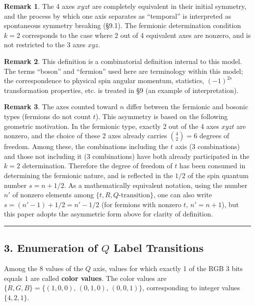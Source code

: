 \documentclass[
  a4paper,11pt]{article}
\theoremstyle{definition}
\theoremstyle{remark}
\begin{document}
\textbf{Remark 1}. The 4 axes \(xyzt\) are completely equivalent in
their initial symmetry, and the process by which one axis separates as
``temporal'' is interpreted as spontaneous symmetry breaking (§9.1). The
fermionic determination condition \(k = 2\) corresponds to the case
where 2 out of 4 equivalent axes are nonzero, and is not restricted to
the 3 axes \(xyz\).

\textbf{Remark 2}. This definition is a combinatorial definition
internal to this model. The terms ``boson'' and ``fermion'' used here
are terminology within this model; the correspondence to physical spin
angular momentum, statistics, \((-1)^{2s}\) transformation properties,
etc. is treated in §9 (an example of interpretation).

\textbf{Remark 3}. The axes counted toward \(n\) differ between the
fermionic and bosonic types (fermions do not count \(t\)). This
asymmetry is based on the following geometric motivation. In the
fermionic type, exactly 2 out of the 4 axes \(xyzt\) are nonzero, and
the choice of these 2 axes already carries \(\binom{4}{2} = 6\) degrees
of freedom. Among these, the combinations including the \(t\) axis (3
combinations) and those not including it (3 combinations) have both
already participated in the \(k = 2\) determination. Therefore the
degree of freedom of \(t\) has been consumed in determining the
fermionic nature, and is reflected in the \(1/2\) of the spin quantum
number \(s = n + 1/2\). As a mathematically equivalent notation, using
the number \(n'\) of nonzero elements among
\(\{t, R, Q\text{-transition}\}\), one can also write
\(s = (n' - 1) + 1/2 = n' - 1/2\) (for fermions with nonzero \(t\),
\(n' = n + 1\)), but this paper adopts the asymmetric form above for
clarity of definition.

\begin{center}\rule{0.5\linewidth}{0.5pt}\end{center}

\subsection{\texorpdfstring{3. Enumeration of \(Q\) Label
Transitions}{3. Enumeration of Q Label Transitions}}\label{enumeration-of-q-label-transitions}

Among the 8 values of the \(Q\) axis, values for which exactly 1 of the
RGB 3 bits equals \(1\) are called \textbf{color values}. The color
values are \(\{R, G, B\} = \{(1,0,0),\, (0,1,0),\, (0,0,1)\}\),
corresponding to integer values \(\{4, 2, 1\}\).
\end{document}
